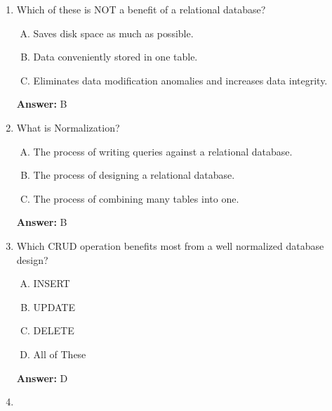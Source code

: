 \documentclass[12pt]{article}
\begin{document}
\begin{enumerate}[1.]
    \item

    Which of these is NOT a benefit of a relational database?

    \bigskip

    \begin{enumerate}[A.]
        \item Saves disk space as much as possible.
        \item Data conveniently stored in one table.
        \item Eliminates data modification anomalies and increases data integrity.
    \end{enumerate}

    \bigskip

    \textbf{Answer:} B

    \item

    What is Normalization?

    \bigskip

    \begin{enumerate}[A.]
        \item The process of writing queries against a relational database.
        \item The process of designing a relational database.
        \item The process of combining many tables into one.
    \end{enumerate}

    \bigskip

    \textbf{Answer:} B

    \item

    Which CRUD operation benefits most from a well normalized database design?

    \bigskip

    \begin{enumerate}[A.]
        \item INSERT
        \item UPDATE
        \item DELETE
        \item All of These
    \end{enumerate}

    \bigskip

    \textbf{Answer:} D

    \item


\end{enumerate}
\end{document}
